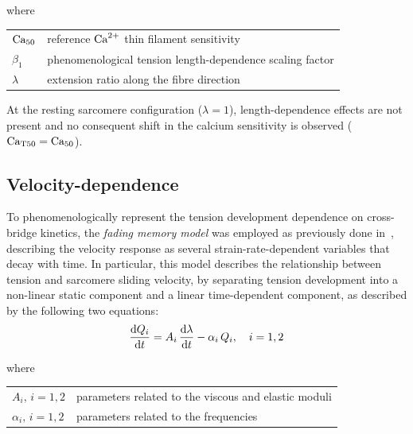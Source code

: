 \noindent
where

\vspace{0.2cm}
\begin{tabular}{ll}
    $\textrm{Ca}_{50}$   & reference $\textrm{Ca}^{2+}$ thin filament sensitivity \\
    $\beta_1$ & phenomenological tension length-dependence scaling factor \\
    $\lambda$ & extension ratio along the fibre direction
\end{tabular}

\vspace{0.3cm}\noindent
At the resting sarcomere configuration ($\lambda=1$), length-dependence effects are not present and no consequent shift in the calcium sensitivity is observed ($\textrm{Ca}_{\textrm{T}50}=\textrm{Ca}_{50}$).



%
%
%
\subsection{Velocity-dependence}\label{sec:ch2velocitydependence}
To phenomenologically represent the tension development dependence on cross-bridge kinetics, the \emph{fading memory model} was employed as previously done in~\cite{Niederer:2006}, describing the velocity response as several strain-rate-dependent variables that decay with time. In particular, this model describes the relationship between tension and sarcomere sliding velocity, by separating tension development into a non-linear static component and a linear time-dependent component, as described by the following two equations:
%
\begin{equation}
    \dfrac{\mathrm{d}{Q_i}}{\mathrm{d}{t}} = A_i\,\dfrac{\mathrm{d}{\lambda}}{\mathrm{d}{t}}-\alpha_i\,Q_i,\quad i=1,2
\end{equation}

\noindent
where

\vspace{0.2cm}
\begin{tabular}{ll}
    $A_i,\,i=1,2$      & parameters related to the viscous and elastic moduli \\
    $\alpha_i,\,i=1,2$ & parameters related to the frequencies
\end{tabular}

